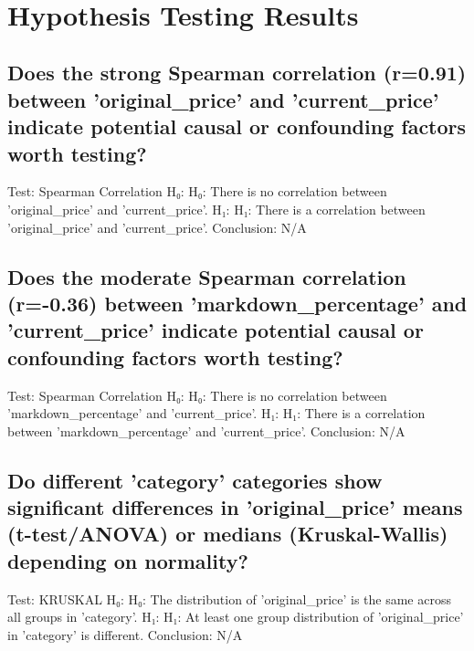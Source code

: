 \documentclass{article}%
\begin{document}
\vspace{10pt}%
\\

%
\section{Hypothesis Testing Results}%
\label{sec:HypothesisTestingResults}%
\subsection{Does the strong Spearman correlation (r=0.91) between 'original\_price' and 'current\_price' indicate potential causal or confounding factors worth testing?}%
\label{subsec:DoesthestrongSpearmancorrelation(r=0.91)betweenoriginalpriceandcurrentpriceindicatepotentialcausalorconfoundingfactorsworthtesting?}%
Test: Spearman Correlation\newline%
H₀: H₀: There is no correlation between 'original\_price' and 'current\_price'.\newline%
H₁: H₁: There is a correlation between 'original\_price' and 'current\_price'.\newline%
Conclusion: N/A

%
\subsection{Does the moderate Spearman correlation (r={-}0.36) between 'markdown\_percentage' and 'current\_price' indicate potential causal or confounding factors worth testing?}%
\label{subsec:DoesthemoderateSpearmancorrelation(r={-}0.36)betweenmarkdownpercentageandcurrentpriceindicatepotentialcausalorconfoundingfactorsworthtesting?}%
Test: Spearman Correlation\newline%
H₀: H₀: There is no correlation between 'markdown\_percentage' and 'current\_price'.\newline%
H₁: H₁: There is a correlation between 'markdown\_percentage' and 'current\_price'.\newline%
Conclusion: N/A

%
\subsection{Do different 'category' categories show significant differences in 'original\_price' means (t{-}test/ANOVA) or medians (Kruskal{-}Wallis) depending on normality?}%
\label{subsec:Dodifferentcategorycategoriesshowsignificantdifferencesinoriginalpricemeans(t{-}test/ANOVA)ormedians(Kruskal{-}Wallis)dependingonnormality?}%
Test: KRUSKAL\newline%
H₀: H₀: The distribution of 'original\_price' is the same across all groups in 'category'.\newline%
H₁: H₁: At least one group distribution of 'original\_price' in 'category' is different.\newline%
Conclusion: N/A
\end{document}
